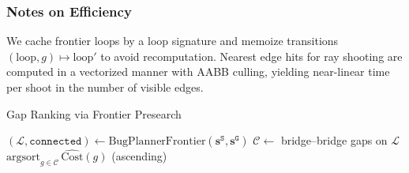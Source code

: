 \subsubsection{Notes on Efficiency}
\label{subsubsec:eff-notes}
We cache frontier loops by a loop signature and memoize transitions
$(\text{loop},g)\!\mapsto\!\text{loop}'$ to avoid recomputation. Nearest
edge hits for ray shooting are computed in a vectorized manner with AABB
culling, yielding near-linear time per shoot in the number of visible edges.
\begin{algorithm}[t]
\caption{Gap Ranking via Frontier Presearch}
\label{alg:gap-ranking}
\DontPrintSemicolon
{}
$(\mathcal{L}, \texttt{connected}) \leftarrow \mathrm{BugPlannerFrontier}(\mathbf{s}^{\texttt{S}},\mathbf{s}^{\texttt{G}})$\;
$\mathcal{C} \leftarrow$ bridge--bridge gaps on $\mathcal{L}$\;
\Return $\mathrm{argsort}_{g\in\mathcal{C}}\,\widehat{\mathrm{Cost}}(g)$ (ascending)\;
\end{algorithm}